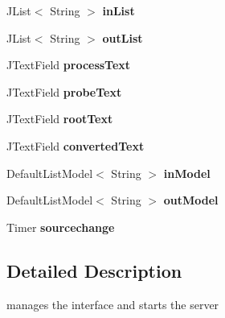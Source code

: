 \begin{DoxyCompactItemize}
\item 
\hypertarget{classvideo_1_1_interface_a013c019a91d836fa7c36118469f2ae4a}{
JList$<$ String $>$ {\bfseries inList}}
\label{classvideo_1_1_interface_a013c019a91d836fa7c36118469f2ae4a}

\item 
\hypertarget{classvideo_1_1_interface_a842bab2003f779cc44d1c41e66d29ef8}{
JList$<$ String $>$ {\bfseries outList}}
\label{classvideo_1_1_interface_a842bab2003f779cc44d1c41e66d29ef8}

\item 
\hypertarget{classvideo_1_1_interface_aaf9ab257953564443c33492397478710}{
JTextField {\bfseries processText}}
\label{classvideo_1_1_interface_aaf9ab257953564443c33492397478710}

\item 
\hypertarget{classvideo_1_1_interface_a9799a9ce7573980a198625991cb2af63}{
JTextField {\bfseries probeText}}
\label{classvideo_1_1_interface_a9799a9ce7573980a198625991cb2af63}

\item 
\hypertarget{classvideo_1_1_interface_a782cb74f7739c471480453e5c9d25f70}{
JTextField {\bfseries rootText}}
\label{classvideo_1_1_interface_a782cb74f7739c471480453e5c9d25f70}

\item 
\hypertarget{classvideo_1_1_interface_a571ca455c3926fa337e0c79e29fb79c1}{
JTextField {\bfseries convertedText}}
\label{classvideo_1_1_interface_a571ca455c3926fa337e0c79e29fb79c1}

\item 
\hypertarget{classvideo_1_1_interface_a191cce4154c72d7c9b3d99b3933144cd}{
DefaultListModel$<$ String $>$ {\bfseries inModel}}
\label{classvideo_1_1_interface_a191cce4154c72d7c9b3d99b3933144cd}

\item 
\hypertarget{classvideo_1_1_interface_a926330858aea4321ae4413ca3b3bb9a2}{
DefaultListModel$<$ String $>$ {\bfseries outModel}}
\label{classvideo_1_1_interface_a926330858aea4321ae4413ca3b3bb9a2}

\item 
\hypertarget{classvideo_1_1_interface_a9ba71d8a5890938345270c4737cad1a5}{
Timer {\bfseries sourcechange}}
\label{classvideo_1_1_interface_a9ba71d8a5890938345270c4737cad1a5}

\end{DoxyCompactItemize}


\subsection{Detailed Description}
manages the interface and starts the server 

